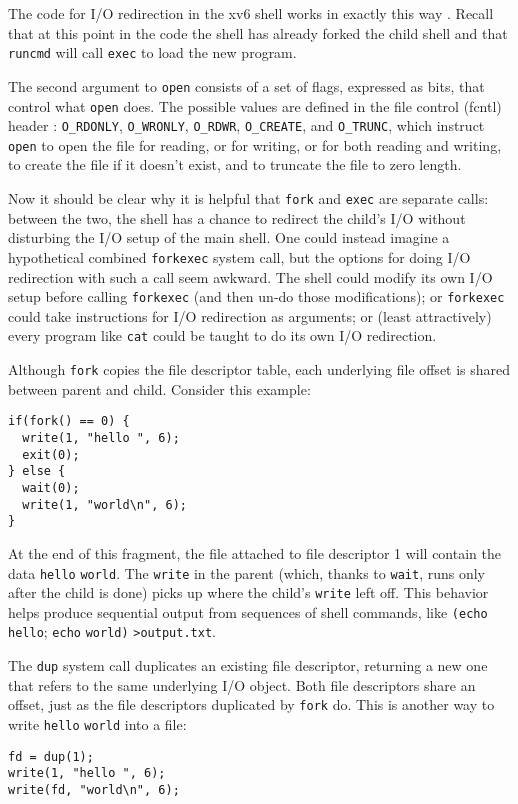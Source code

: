 The code for I/O redirection in the xv6 shell works in exactly this way
.
Recall that at this point in the code the shell has already forked the
child shell and that
\lstinline{runcmd}
will call
\lstinline{exec}
to load the new program.

The second argument to \lstinline{open} consists of a set of
flags, expressed as bits, that control what \lstinline{open}
does. The possible values are defined in the file control (fcntl) header
:
\lstinline{O_RDONLY},
\lstinline{O_WRONLY},
\lstinline{O_RDWR},
\lstinline{O_CREATE}, and
\lstinline{O_TRUNC},
which instruct \lstinline{open} to
open the file for reading,
or for writing,
or for both reading and writing,
to create the file if it doesn't exist,
and to truncate the file to zero length.

Now it should be clear why it is helpful that
\lstinline{fork}
and
\lstinline{exec}
are separate calls: between the two, the shell has a chance
to redirect the child's I/O without disturbing the I/O setup of the main shell.
One could instead imagine a hypothetical combined
\lstinline{forkexec} system call,
but the options for doing I/O redirection with such a call
seem awkward.
The shell could modify its own I/O
setup before calling \lstinline{forkexec} (and then
un-do those modifications); or
\lstinline{forkexec} could take instructions for I/O
redirection as arguments;
or (least attractively) every program like \lstinline{cat} could
be taught to do its own I/O redirection.

Although
\lstinline{fork}
copies the file descriptor table, each underlying file offset is shared
between parent and child.
Consider this example:
\begin{lstlisting}[]
if(fork() == 0) {
  write(1, "hello ", 6);
  exit(0);
} else {
  wait(0);
  write(1, "world\n", 6);
}
\end{lstlisting}
At the end of this fragment, the file attached to file descriptor 1
will contain the data
\lstinline{hello}
\lstinline{world}.
The
\lstinline{write}
in the parent
(which, thanks to
\lstinline{wait},
runs only after the child is done)
picks up where the child's
\lstinline{write}
left off.
This behavior helps produce sequential output from sequences
of shell commands, like
\lstinline{(echo}
\lstinline{hello};
\lstinline{echo}
\lstinline{world)}
\lstinline{>output.txt}.

The
\lstinline{dup}
system call duplicates an existing file descriptor,
returning a new one that refers to the same underlying I/O object.
Both file descriptors share an offset, just as the file descriptors
duplicated by
\lstinline{fork}
do.
This is another way to write
\lstinline{hello}
\lstinline{world}
into a file:
\begin{lstlisting}[]
fd = dup(1);
write(1, "hello ", 6);
write(fd, "world\n", 6);
\end{lstlisting}

